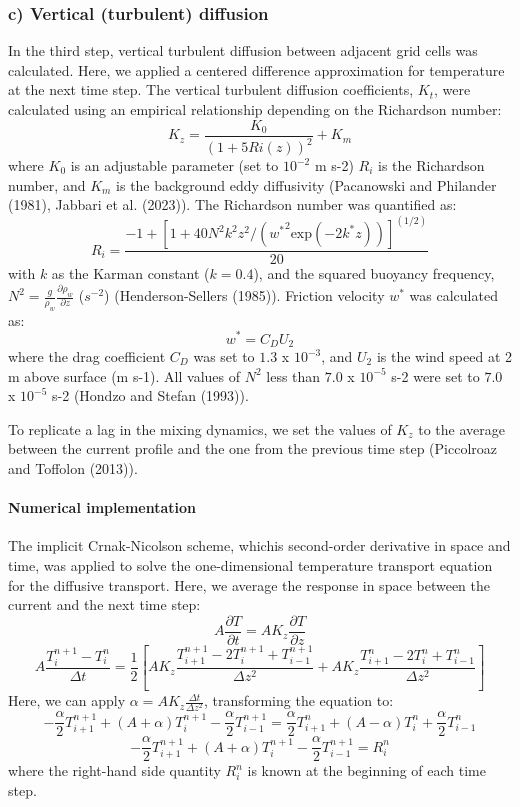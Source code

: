 \documentclass[
  letterpaper,
  DIV=11,
  numbers=noendperiod]{scrartcl}
\let\oldparagraph\paragraph
\renewcommand{\paragraph}[1]{\oldparagraph{#1}\mbox{}}
\begin{document}
\hypertarget{c-vertical-turbulent-diffusion}{%
\subsubsection{c) Vertical (turbulent)
diffusion}\label{c-vertical-turbulent-diffusion}}

In the third step, vertical turbulent diffusion between adjacent grid
cells was calculated. Here, we applied a centered difference
approximation for temperature at the next time step. The vertical
turbulent diffusion coefficients, \(K_t\), were calculated using an
empirical relationship depending on the Richardson number: \[
    K_z = \frac{K_0}{(1+5 Ri(z))^2} + K_m
\] where \(K_0\) is an adjustable parameter (set to \(10^{-2}\) m s-2)
\(R_i\) is the Richardson number, and \(K_m\) is the background eddy
diffusivity (Pacanowski and Philander (1981), Jabbari et al. (2023)).
The Richardson number was quantified as: \[
    R_i= \frac{-1 + [1+ 40 N^2 k^2 z^2 / \left({w^*}^2 \text{exp}(-2 k^* z)\right)]^{(1/2)}}{20}
\] with \(k\) as the Karman constant (\(k=0.4\)), and the squared
buoyancy frequency,
\(N^2=\frac{g}{\rho_w}\frac{\partial \rho_w}{\partial z}\) (\(s^{-2}\))
(Henderson-Sellers (1985)). Friction velocity \(w^*\) was calculated as:
\[
    w^*= C_D U_2 
\] where the drag coefficient \(C_D\) was set to \(1.3\) x \(10^{-3}\),
and \(U_2\) is the wind speed at 2 m above surface (m s-1). All values
of \(N^2\) less than \(7.0\) x \(10^{-5}\) s-2 were set to \(7.0\) x
\(10^{-5}\) s-2 (Hondzo and Stefan (1993)).

To replicate a lag in the mixing dynamics, we set the values of \(K_z\)
to the average between the current profile and the one from the previous
time step (Piccolroaz and Toffolon (2013)).

\hypertarget{numerical-implementation}{%
\paragraph{Numerical implementation}\label{numerical-implementation}}

The implicit Crnak-Nicolson scheme, whichis second-order derivative in
space and time, was applied to solve the one-dimensional temperature
transport equation for the diffusive transport. Here, we average the
response in space between the current and the next time step: \[
A \frac{\partial T}{\partial t}=A K_z \frac{\partial T}{\partial z}
\] \[
A \frac{T_i^{n+1} - T_i^n}{\Delta t} = \frac{1}{2} [A K_z \frac{T_{i+1}^{n+1} - 2 T_i^{n+1} + T_{i-1}^{n+1}}{\Delta z^2} +  A K_z \frac{T_{i+1}^{n} - 2 T_i^n + T_{i-1}^n}{\Delta z^2}]
\] Here, we can apply \(\alpha = A K_z \frac{\Delta t}{\Delta z^2}\),
transforming the equation to: \[
- \frac{\alpha}{2} T_{i+1}^{n+1} + (A+\alpha)T_{i}^{n+1}- \frac{\alpha}{2}T_{i-1}^{n+1} =\frac{\alpha}{2} T_{i+1}^{n} + (A-\alpha)T_{i}^{n}+ \frac{\alpha}{2}T_{i-1}^{n}
\] \[
- \frac{\alpha}{2} T_{i+1}^{n+1} + (A+\alpha)T_{i}^{n+1}- \frac{\alpha}{2}T_{i-1}^{n+1} = R_i^n
\] where the right-hand side quantity \(R_i^n\) is known at the
beginning of each time step.
\end{document}
